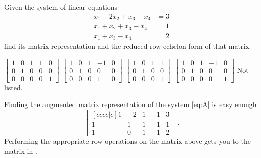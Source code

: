 \begin{questions}
  \question[10] Given the system of linear equations
  \[
    \label{eq:A}
    \tag{$\star$}
    \begin{aligned}
      x_1-2x_2+x_3-x_4&=3\\
      x_1+x_2+x_3-x_4&=1\\
      x_1+x_3-x_4&=2
    \end{aligned}
  \]
    find its matrix representation and the reduced row-echelon form of that
    matrix.
  \begin{choices}
    \choice $\left[
      \begin{smallmatrix}
        1&0&1&1&0\\0&1&0&0&0\\0&0&0&0&1
      \end{smallmatrix}
    \right]$%
    \choice $\left[
      \begin{smallmatrix}
        1&0&1&-1&0\\0&1&0&0&0\\0&0&0&1&0
      \end{smallmatrix}
    \right]$%
    \choice $\left[
      \begin{smallmatrix}
        1&0&1&1\\0&1&0&0\\0&0&0&1
      \end{smallmatrix}
    \right]$%
    \CorrectChoice $\left[
      \begin{smallmatrix}
        1&0&1&-1&0\\0&1&0&0&0\\0&0&0&0&1
      \end{smallmatrix}
    \right]$%
    \choice Not listed.
  \end{choices}
  \begin{solution}
    Finding the augmented matrix representation of the system \eqref{eq:A}
    is easy enough
    \[
      \begin{bmatrix}[cccc|c]
        1&-2&1&-1&3\\
        1&1&1&-1&1\\
        1&0&1&-1&2
      \end{bmatrix}.
    \]
    Performing the appropriate row operations on the matrix above gets you
    to the matrix in .
  \end{solution}


\end{questions}

